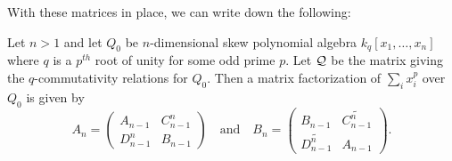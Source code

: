 \documentclass[12pt]{article}
\begin{document}
With these matrices in place, we can write down the following:
\begin{prop}\label{prop:factorization}
    Let $n>1$ and let $Q_0$ be $n$-dimensional skew polynomial algebra $k_q[x_1,\dots,x_n]$ where $q$ is a $p^{th}$ root of unity for some odd prime $p$. Let $\mathcal{Q}$ be the matrix giving the $q$-commutativity relations for $Q_0$. Then a matrix factorization of $\sum_i x_i^p$ over $Q_0$ is given by
    \[A_n=\begin{pmatrix}A_{n-1} & C_{n-1}^n\\D_{n-1}^n& B_{n-1}\end{pmatrix}\quad\text{and}\quad B_n=\begin{pmatrix}B_{n-1}&\widetilde{C_{n-1}^n}\\ \widetilde{D_{n-1}^n} & A_{n-1}\end{pmatrix}.\]
\end{prop}
\end{document}
